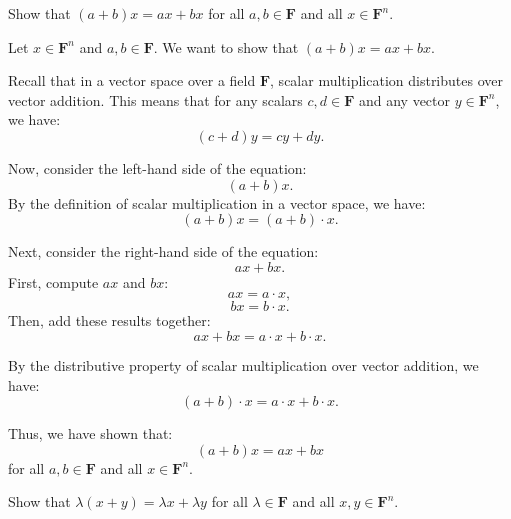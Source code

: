 \begin{exercise}
Show that $(a+b)x = ax + bx$ for all $a, b \in \mathbf{F}$ and all $x \in \mathbf{F}^{n}$.
\end{exercise}

\begin{solution}
Let $x \in \mathbf{F}^{n}$ and $a, b \in \mathbf{F}$. We want to show that $(a+b)x = ax + bx$.

Recall that in a vector space over a field $\mathbf{F}$, scalar multiplication distributes over vector addition. This means that for any scalars $c, d \in \mathbf{F}$ and any vector $y \in \mathbf{F}^{n}$, we have:
\[
(c + d)y = cy + dy.
\]

Now, consider the left-hand side of the equation:
\[
(a + b)x.
\]
By the definition of scalar multiplication in a vector space, we have:
\[
(a + b)x = (a + b) \cdot x.
\]

Next, consider the right-hand side of the equation:
\[
ax + bx.
\]
First, compute $ax$ and $bx$:
\[
ax = a \cdot x,
\]
\[
bx = b \cdot x.
\]
Then, add these results together:
\[
ax + bx = a \cdot x + b \cdot x.
\]

By the distributive property of scalar multiplication over vector addition, we have:
\[
(a + b) \cdot x = a \cdot x + b \cdot x.
\]

Thus, we have shown that:
\[
(a + b)x = ax + bx
\]
for all $a, b \in \mathbf{F}$ and all $x \in \mathbf{F}^{n}$.
\end{solution}

\begin{exercise}
Show that $\lambda(x + y) = \lambda x + \lambda y$ for all $\lambda \in \mathbf{F}$ and all $x, y \in \mathbf{F}^{n}$.
\end{exercise}


